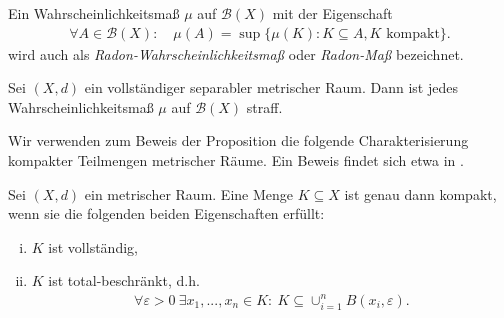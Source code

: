 \begin{remark}
    Ein Wahrscheinlichkeitsmaß $\mu$ auf $\mathcal{B}(X)$ mit der Eigenschaft
    \begin{align*}
        \forall A \in \mathcal{B}(X): \quad \mu(A) = \sup\{\mu(K): K \subseteq A, K \text{ kompakt}\}. 
    \end{align*}
    wird auch als \textit{Radon-Wahrscheinlichkeitsmaß} oder \textit{Radon-Maß} bezeichnet.
\end{remark}

\begin{proposition}
    Sei $(X,d)$ ein vollständiger separabler metrischer Raum. Dann ist jedes Wahrscheinlichkeitsmaß $\mu$ auf $\mathcal{B}(X)$ straff.
\end{proposition}

Wir verwenden zum Beweis der Proposition die folgende Charakterisierung kompakter Teilmengen metrischer Räume. Ein Beweis findet sich etwa in \cite{amann}. 

\begin{lemma}
    Sei $(X,d)$ ein metrischer Raum. Eine Menge $K \subseteq X$ ist genau dann kompakt, wenn sie die folgenden beiden Eigenschaften erfüllt:
    \begin{enumerate}[(i)]
        \item $K$ ist vollständig,
        \item $K$ ist total-beschränkt, d.h.
        \begin{align*}
            \forall  \varepsilon > 0 \ \exists x_1,...,x_n \in K: \  K \subseteq \cup_{i=1}^n B(x_i, \varepsilon). 
        \end{align*} 
\end{enumerate}
\end{lemma}

